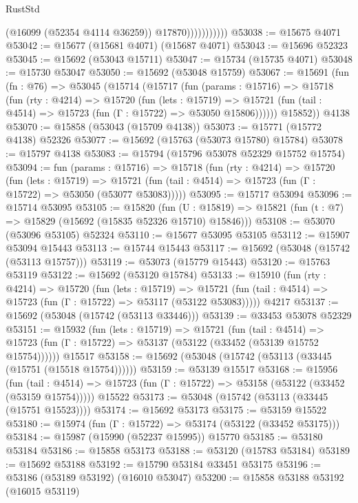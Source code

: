 \begin{lexlean}{RustStd}
\begin{coremodule}
                          (@16099 (@52354 @4114 @36259))
                          @17870)))))))))))
@53038 := @15675 @4071
@53042 := @15677 (@15681 @4071) (@15687 @4071)
@53043 := @15696 @52323
@53045 := @15692 (@53043 @15711)
@53047 := @15734 (@15735 @4071)
@53048 := @15730 @53047
@53050 := @15692 (@53048 @15759)
@53067 := @15691
    (fun (fn : @76) =>
    @53045
      (@15714
        (@15717
          (fun (params : @15716) =>
          @15718
            (fun (rty : @4214) =>
            @15720
              (fun (lets : @15719) =>
              @15721 (fun (tail : @4514) => @15723 (fun (Γ : @15722) => @53050 @15806))))))
        @15852))
    @4138
@53070 := @15858 (@53043 (@15709 @4138))
@53073 := @15771 (@15772 @4138) @52326
@53077 := @15692 (@15763 (@53073 @15780) @15784)
@53078 := @15797 @4138
@53083 := @15794 (@15796 @53078 @52329 @15752 @15754)
@53094 := fun (params : @15716) =>
  @15718
    (fun (rty : @4214) =>
    @15720
      (fun (lets : @15719) =>
      @15721 (fun (tail : @4514) => @15723 (fun (Γ : @15722) => @53050 (@53077 @53083)))))
@53095 := @15717 @53094
@53096 := @15714 @53095
@53105 := @15820
    (fun (U : @15819) => @15821 (fun (t : @7) => @15829 (@15692 (@15835 @52326 @15710) @15846)))
@53108 := @53070 (@53096 @53105) @52324
@53110 := @15677 @53095 @53105
@53112 := @15907 @53094 @15443
@53113 := @15744 @15443
@53117 := @15692 (@53048 (@15742 (@53113 @15757)))
@53119 := @53073 (@15779 @15443)
@53120 := @15763 @53119
@53122 := @15692 (@53120 @15784)
@53133 := @15910
    (fun (rty : @4214) =>
    @15720
      (fun (lets : @15719) =>
      @15721 (fun (tail : @4514) => @15723 (fun (Γ : @15722) => @53117 (@53122 @53083)))))
    @4217
@53137 := @15692 (@53048 (@15742 (@53113 @33446)))
@53139 := @33453 @53078 @52329
@53151 := @15932
    (fun (lets : @15719) =>
    @15721
      (fun (tail : @4514) =>
      @15723 (fun (Γ : @15722) => @53137 (@53122 (@33452 (@53139 @15752 @15754))))))
    @15517
@53158 := @15692 (@53048 (@15742 (@53113 (@33445 (@15751 (@15518 @15754))))))
@53159 := @53139 @15517
@53168 := @15956
    (fun (tail : @4514) => @15723 (fun (Γ : @15722) => @53158 (@53122 (@33452 (@53159 @15754)))))
    @15522
@53173 := @53048 (@15742 (@53113 (@33445 (@15751 @15523))))
@53174 := @15692 @53173
@53175 := @53159 @15522
@53180 := @15974 (fun (Γ : @15722) => @53174 (@53122 (@33452 @53175)))
@53184 := @15987 (@15990 (@52237 @15995)) @15770
@53185 := @53180 @53184
@53186 := @15858 @53173
@53188 := @53120 (@15783 @53184)
@53189 := @15692 @53188
@53192 := @15790 @53184 @33451 @53175
@53196 := @53186 (@53189 @53192) (@16010 @53047)
@53200 := @15858 @53188 @53192 (@16015 @53119)

\end{coremodule}
\end{lexlean}
